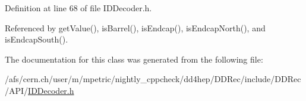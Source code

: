Definition at line 68 of file IDDecoder.h.

Referenced by getValue(), isBarrel(), isEndcap(), isEndcapNorth(), and isEndcapSouth().

The documentation for this class was generated from the following file:\begin{DoxyCompactItemize}
\item 
/afs/cern.ch/user/m/mpetric/nightly\_\-cppcheck/dd4hep/DDRec/include/DDRec/API/\hyperlink{_i_d_decoder_8h}{IDDecoder.h}\end{DoxyCompactItemize}
